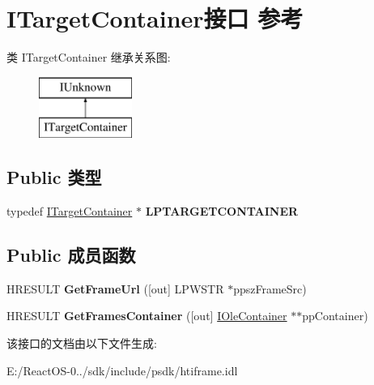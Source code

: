\hypertarget{interface_i_target_container}{}\section{I\+Target\+Container接口 参考}
\label{interface_i_target_container}
类 I\+Target\+Container 继承关系图\+:\begin{figure}[H]
\begin{center}
\leavevmode
\includegraphics[height=2.000000cm]{interface_i_target_container}
\end{center}
\end{figure}
\subsection*{Public 类型}
\begin{DoxyCompactItemize}
\item 
\mbox{\label{interface_i_target_container_acb03f9834cd4b5a5b12b795f659fd878}} 
typedef \hyperlink{interface_i_target_container}{I\+Target\+Container} $\ast$ {\bfseries L\+P\+T\+A\+R\+G\+E\+T\+C\+O\+N\+T\+A\+I\+N\+ER}
\end{DoxyCompactItemize}
\subsection*{Public 成员函数}
\begin{DoxyCompactItemize}
\item 
\mbox{\label{interface_i_target_container_a048bf25451e2fea4fb7debf4c963c5fa}} 
H\+R\+E\+S\+U\+LT {\bfseries Get\+Frame\+Url} (\mbox{[}out\mbox{]} L\+P\+W\+S\+TR $\ast$ppsz\+Frame\+Src)
\item 
\mbox{\label{interface_i_target_container_a3b61bb8469f702d655e71656a61ebaa7}} 
H\+R\+E\+S\+U\+LT {\bfseries Get\+Frames\+Container} (\mbox{[}out\mbox{]} \hyperlink{interface_i_ole_container}{I\+Ole\+Container} $\ast$$\ast$pp\+Container)
\end{DoxyCompactItemize}


该接口的文档由以下文件生成\+:\begin{DoxyCompactItemize}
\item 
E\+:/\+React\+O\+S-\/0../sdk/include/psdk/htiframe.\+idl\end{DoxyCompactItemize}
